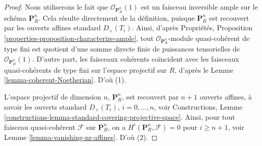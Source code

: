 \begin{proof}
Nous utiliserons le fait que $\mathcal{O}_{\mathbf{P}^n_R}(1)$ est un faisceau
inversible ample sur le schéma
$\mathbf{P}^n_R$. Cela résulte directement de la définition,
puisque $\mathbf{P}^n_R$ est recouvert par les ouverts affines standard $D_{+}(T_i)$.
Ainsi, d'après
Propriétés, Proposition \ref{properties-proposition-characterize-ample},
tout $\mathcal{O}_{\mathbf{P}^n_R}$-module quasi-cohérent de type fini
est quotient d'une somme directe finie de puissances tensorielles de
$\mathcal{O}_{\mathbf{P}^n_R}(1)$. D'autre part, les faisceaux cohérents
coïncident avec les faisceaux quasi-cohérents de type fini sur l'espace
projectif sur $R$, d'après le Lemme \ref{lemma-coherent-Noetherian}. D'où (1).

\medskip\noindent
L'espace projectif de dimension $n$, $\mathbf{P}^n_R$, est recouvert par $n + 1$
ouverts affines, à savoir les ouverts standard $D_{+}(T_i)$, $i = 0, \ldots, n$, voir Constructions,
Lemme \ref{constructions-lemma-standard-covering-projective-space}.
Ainsi, pour tout faisceau quasi-cohérent
$\mathcal{F}$ sur $\mathbf{P}^n_R$,
on a $H^i(\mathbf{P}^n_R, \mathcal{F}) = 0$ pour $i \geq n + 1$,
voir Lemme \ref{lemma-vanishing-nr-affines}. D'où (2).


\end{proof}
